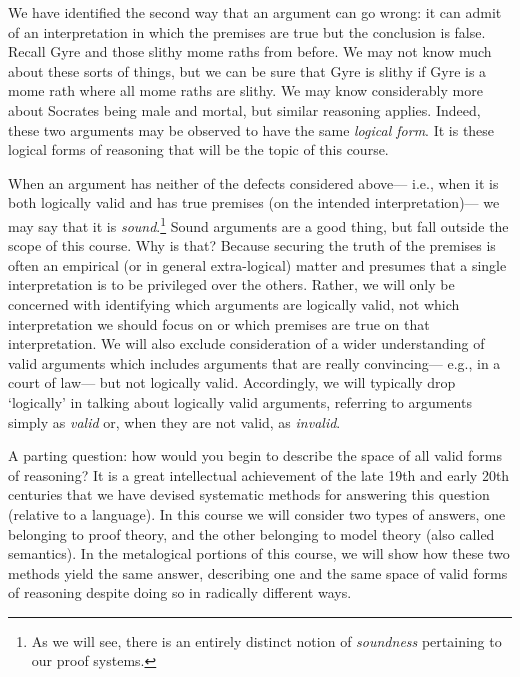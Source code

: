 We have identified the second way that an argument can go wrong: it can admit of an interpretation in which the premises are true but the conclusion is false.
Recall Gyre and those slithy mome raths from before.
We may not know much about these sorts of things, but we can be sure that Gyre is slithy if Gyre is a mome rath where all mome raths are slithy.
We may know considerably more about Socrates being male and mortal, but similar reasoning applies.
Indeed, these two arguments may be observed to have the same \textit{logical form}.
It is these logical forms of reasoning that will be the topic of this course.

When an argument has neither of the defects considered above--- i.e., when it is both logically valid and has true premises (on the intended interpretation)--- we may say that it is \textit{sound}.\footnote{As we will see, there is an entirely distinct notion of \textit{soundness} pertaining to our proof systems.}
Sound arguments are a good thing, but fall outside the scope of this course.
Why is that?
Because securing the truth of the premises is often an empirical (or in general extra-logical) matter and presumes that a single interpretation is to be privileged over the others.
Rather, we will only be concerned with identifying which arguments are logically valid, not which interpretation we should focus on or which premises are true on that interpretation.
We will also exclude consideration of a wider understanding of valid arguments which includes arguments that are really convincing--- e.g., in a court of law--- but not logically valid.
Accordingly, we will typically drop `logically' in talking about logically valid arguments, referring to arguments simply as \textit{valid} or, when they are not valid, as \textit{invalid}.

A parting question: how would you begin to describe the space of all valid forms of reasoning? 
It is a great intellectual achievement of the late 19th and early 20th centuries that we have devised systematic methods for answering this question (relative to a language).
In this course we will consider two types of answers, one belonging to proof theory, and the other belonging to model theory (also called semantics).
In the metalogical portions of this course, we will show how these two methods yield the same answer, describing one and the same space of valid forms of reasoning despite doing so in radically different ways.





